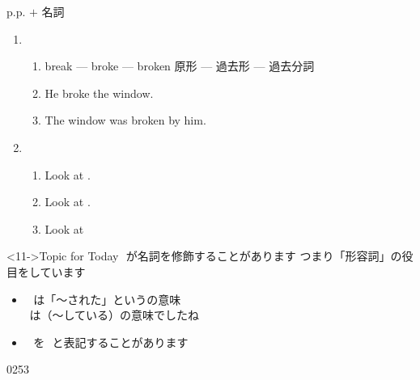 \documentclass[aspectratio=169,xcolor={dvipsnames,table}]{beamer}
\begin{document}
 \begin{frame}[plain,t]{p.p. $+$ 名詞}
  \begin{enumerate}
   \item \begin{enumerate}
	  \item<1-> break --- broke --- broken%
\hfill{}{\scriptsize 原形 --- 過去形 --- 過去分詞}
	  \item<2-> He broke the window.
	  \item<3-> The window was broken by him.\hfill\visible<4->{\scriptsize \text{受け身} $=$ \Circled{\,\,be動詞 $+$ 過去分詞\,\,}}
	 \end{enumerate}
   \item \begin{enumerate}
	  \item<5-> Look at .%
\hfill{}
	  \item<7-> Look at .%
\hfill{}
	  \item<9-> Look at %
\hfill{}
	 \end{enumerate}
  \end{enumerate}

\vspace{8pt}

\begin{block}<11->{Topic for Today}\small
{}\,\,が名詞を修飾することがあります%
\hfill{\scriptsize つまり「形容詞」の役目をしています}

\begin{itemize}[square]\small
 \item \,\,\,\,は「～された」というの意味\\
\hfill{\scriptsize {}\,\,は（～している）の意味でしたね}
 \item \,\,\,\,を\,\,\,\,と表記することがあります
 \end{itemize}
     \end{block}

\vspace*{-12pt}

\hfill{\tiny 0253}\,{\scriptsize {}}
\end{frame}
\end{document}
